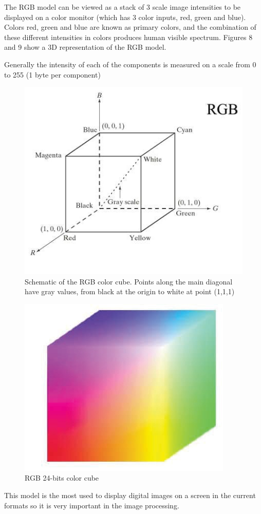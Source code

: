The RGB model can be viewed as a stack of 3 scale image intensities to be displayed on a color monitor (which has 3 color inputs, red, green and blue). Colors red, green and blue are known as primary colors, and the combination of these different intensities in colors produces human visible spectrum. Figures 8 and 9 show a 3D representation of the RGB model.

Generally the intensity of each of the components is measured on a scale from 0 to 255 (1 byte per component)

\begin{figure}
	\centering  
  	\includegraphics[scale=1]{images/ch2/RGBColorCube.jpg}
  	\caption{Schematic of the RGB color cube. Points along the main diagonal have gray values, from black at the origin to white at point (1,1,1)}
  	\label{fig:RGBColorCube}
\end{figure}

\begin{figure}
	\centering
  	\includegraphics[scale=0.8]{images/ch2/RGB24ColorCube.jpg}
  	\caption{RGB 24-bits color cube}
  	\label{fig:RGBColorCube}
\end{figure}
This model is the most used to display digital images on a screen in the current formats so it is very important in the image processing.

